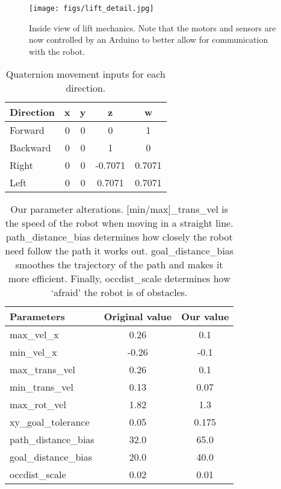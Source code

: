 \documentclass{article}
\begin{document}
\begin{figure}
  \begin{center}
    \texttt{[image: figs/lift\_detail.jpg]}
    \caption{Inside view of lift mechanics. Note that the motors and sensors are now controlled by an Arduino to better allow for communication with the robot. }
  \label{fig:arduino}
  \end{center}
\end{figure}


\begin{table}[h]
\vskip 3mm
\begin{center}
\begin{tabular}{lcccc}
\hline
\abovespace\belowspace
Direction & x & y & z & w \\
\hline
  Forward & 0 & 0 & 0 & 1\\
  Backward & 0 & 0 & 1 & 0 \\
  Right & 0 & 0 & -0.7071 & 0.7071 \\
  Left & 0 & 0 & 0.7071 & 0.7071 
\end{tabular}
\caption{Quaternion movement inputs for each direction.}
\label{tab:quaternions}
\end{center}
\vskip -3mm
\end{table}
\begin{table}[h]
\vskip 3mm
\begin{center}
\begin{tabular}{lcc}
\hline
\abovespace\belowspace
Parameters & Original value & Our value \\
\hline
  max\_vel\_x & 0.26 & 0.1 \\
  min\_vel\_x & -0.26 & -0.1 \\
  max\_trans\_vel & 0.26 & 0.1 \\
  min\_trans\_vel & 0.13 & 0.07 \\
  max\_rot\_vel & 1.82 & 1.3 \\
  xy\_goal\_tolerance & 0.05 & 0.175 \\
  path\_distance\_bias & 32.0 & 65.0 \\
  goal\_distance\_bias & 20.0 & 40.0 \\
  occdist\_scale & 0.02 & 0.01
\end{tabular}
\caption{Our parameter alterations. [min/max]\_trans\_vel is the speed of the robot when moving in a straight line. path\_distance\_bias determines how closely the robot need follow the path it works out. goal\_distance\_bias smoothes the trajectory of the path and makes it more efficient. Finally, occdist\_scale determines how `afraid' the robot is of obstacles.}
\label{tab:params}
\end{center}
\vskip -3mm
\end{table}
\end{document}
